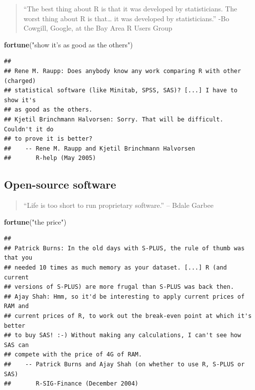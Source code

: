 \documentclass[]{book}
\makeatletter
\newenvironment{Shaded}{\begin{snugshade}}{\end{snugshade}}
\newcommand{\KeywordTok}[1]{\textcolor[rgb]{0.13,0.29,0.53}{\textbf{#1}}}
\newcommand{\StringTok}[1]{\textcolor[rgb]{0.31,0.60,0.02}{#1}}
\newcommand{\NormalTok}[1]{#1}
\newenvironment{kframe}{%
\medskip{}
\setlength{\fboxsep}{.8em}
 \def\at@end@of@kframe{}%
 \ifinner\ifhmode%
  \def\at@end@of@kframe{\end{minipage}}%
  \begin{minipage}{\columnwidth}%
 \fi\fi%
 \def\FrameCommand##1{\hskip\@totalleftmargin \hskip-\fboxsep
 \colorbox{shadecolor}{##1}\hskip-\fboxsep
     \hskip-\linewidth \hskip-\@totalleftmargin \hskip\columnwidth}%
 \MakeFramed {\advance\hsize-\width
   \@totalleftmargin\z@ \linewidth\hsize
   \@setminipage}}%
 {\par\unskip\endMakeFramed%
 \at@end@of@kframe}
\renewenvironment{Shaded}{\begin{kframe}}{\end{kframe}}
\theoremstyle{definition}
\theoremstyle{definition}
\theoremstyle{definition}
\theoremstyle{remark}
\makeatother
\begin{document}
\begin{quote}
``The best thing about R is that it was developed by statisticians. The
worst thing about R is that\ldots{} it was developed by statisticians.''
-Bo Cowgill, Google, at the Bay Area R Users Group
\end{quote}

\begin{Shaded}
\begin{Highlighting}[]
\KeywordTok{fortune}\NormalTok{(}\StringTok{"show it's as good as the others"}\NormalTok{)}
\end{Highlighting}
\end{Shaded}

\begin{verbatim}
## 
## Rene M. Raupp: Does anybody know any work comparing R with other (charged)
## statistical software (like Minitab, SPSS, SAS)? [...] I have to show it's
## as good as the others.
## Kjetil Brinchmann Halvorsen: Sorry. That will be difficult. Couldn't it do
## to prove it is better?
##    -- Rene M. Raupp and Kjetil Brinchmann Halvorsen
##       R-help (May 2005)
\end{verbatim}

\subsection{Open-source software}\label{open-source-software}

\begin{quote}
``Life is too short to run proprietary software.'' -- Bdale Garbee
\end{quote}

\begin{Shaded}
\begin{Highlighting}[]
\KeywordTok{fortune}\NormalTok{(}\StringTok{"the price"}\NormalTok{)}
\end{Highlighting}
\end{Shaded}

\begin{verbatim}
## 
## Patrick Burns: In the old days with S-PLUS, the rule of thumb was that you
## needed 10 times as much memory as your dataset. [...] R (and current
## versions of S-PLUS) are more frugal than S-PLUS was back then.
## Ajay Shah: Hmm, so it'd be interesting to apply current prices of RAM and
## current prices of R, to work out the break-even point at which it's better
## to buy SAS! :-) Without making any calculations, I can't see how SAS can
## compete with the price of 4G of RAM.
##    -- Patrick Burns and Ajay Shah (on whether to use R, S-PLUS or SAS)
##       R-SIG-Finance (December 2004)
\end{verbatim}
\end{document}
